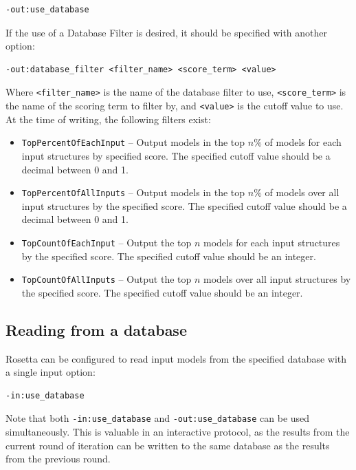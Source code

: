 \singlespace
\begin{Verbatim}
-out:use_database
\end{Verbatim}
\doublespace

If the use of a Database Filter is desired, it should be specified with another option:

\singlespace
\begin{Verbatim}
-out:database_filter <filter_name> <score_term> <value>
\end{Verbatim}
\doublespace

Where \texttt{<filter\_name>} is the name of the database filter to use, \texttt{<score\_term>} is the name of the scoring term to filter by, and \texttt{<value>} is the cutoff value to use. 
At the time of writing, the following filters exist:

\begin{itemize}
	\item \texttt{TopPercentOfEachInput} -- Output models in the top $n\%$ of models for each input structures by specified score.
	The specified cutoff value should be a decimal between 0 and 1. 
	\item \texttt{TopPercentOfAllInputs} -- Output models in the top $n\%$ of models over all input structures by the specified score.
	The specified cutoff value should be a decimal between 0 and 1.
	\item \texttt{TopCountOfEachInput} -- Output the top $n$ models for each input structures by the specified score.
	The specified cutoff value should be an integer.
	\item \texttt{TopCountOfAllInputs} -- Output the top $n$ models over all input structures by the specified score.
	The specified cutoff value should be an integer.
\end{itemize}

\subsection{Reading from a database}

Rosetta can be configured to read input models from the specified database with a single input option:

\singlespace
\begin{Verbatim}
-in:use_database
\end{Verbatim}
\doublespace

Note that both \texttt{-in:use\_database} and \texttt{-out:use\_database} can be used simultaneously.
This is valuable in an interactive protocol, as the results from the current round of iteration can be written to the same database as the results from the previous round. 

